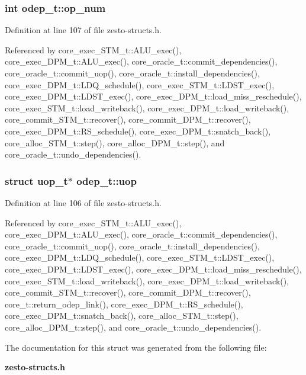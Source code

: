 \subsubsection[{op\_\-num}]{\setlength{\rightskip}{0pt plus 5cm}int {\bf odep\_\-t::op\_\-num}}\label{structodep__t_a9047cb0f60d68673900ec2fd18b2263}




Definition at line 107 of file zesto-structs.h.

Referenced by core\_\-exec\_\-STM\_\-t::ALU\_\-exec(), core\_\-exec\_\-DPM\_\-t::ALU\_\-exec(), core\_\-oracle\_\-t::commit\_\-dependencies(), core\_\-oracle\_\-t::commit\_\-uop(), core\_\-oracle\_\-t::install\_\-dependencies(), core\_\-exec\_\-DPM\_\-t::LDQ\_\-schedule(), core\_\-exec\_\-STM\_\-t::LDST\_\-exec(), core\_\-exec\_\-DPM\_\-t::LDST\_\-exec(), core\_\-exec\_\-DPM\_\-t::load\_\-miss\_\-reschedule(), core\_\-exec\_\-STM\_\-t::load\_\-writeback(), core\_\-exec\_\-DPM\_\-t::load\_\-writeback(), core\_\-commit\_\-STM\_\-t::recover(), core\_\-commit\_\-DPM\_\-t::recover(), core\_\-exec\_\-DPM\_\-t::RS\_\-schedule(), core\_\-exec\_\-DPM\_\-t::snatch\_\-back(), core\_\-alloc\_\-STM\_\-t::step(), core\_\-alloc\_\-DPM\_\-t::step(), and core\_\-oracle\_\-t::undo\_\-dependencies().
\subsubsection[{uop}]{\setlength{\rightskip}{0pt plus 5cm}struct {\bf uop\_\-t}$\ast$ {\bf odep\_\-t::uop}\hspace{0.3cm}{\tt  [read]}}\label{structodep__t_4870c3718dfdc8a6ac81f2455e8e7b60}




Definition at line 106 of file zesto-structs.h.

Referenced by core\_\-exec\_\-STM\_\-t::ALU\_\-exec(), core\_\-exec\_\-DPM\_\-t::ALU\_\-exec(), core\_\-oracle\_\-t::commit\_\-dependencies(), core\_\-oracle\_\-t::commit\_\-uop(), core\_\-oracle\_\-t::install\_\-dependencies(), core\_\-exec\_\-DPM\_\-t::LDQ\_\-schedule(), core\_\-exec\_\-STM\_\-t::LDST\_\-exec(), core\_\-exec\_\-DPM\_\-t::LDST\_\-exec(), core\_\-exec\_\-DPM\_\-t::load\_\-miss\_\-reschedule(), core\_\-exec\_\-STM\_\-t::load\_\-writeback(), core\_\-exec\_\-DPM\_\-t::load\_\-writeback(), core\_\-commit\_\-STM\_\-t::recover(), core\_\-commit\_\-DPM\_\-t::recover(), core\_\-t::return\_\-odep\_\-link(), core\_\-exec\_\-DPM\_\-t::RS\_\-schedule(), core\_\-exec\_\-DPM\_\-t::snatch\_\-back(), core\_\-alloc\_\-STM\_\-t::step(), core\_\-alloc\_\-DPM\_\-t::step(), and core\_\-oracle\_\-t::undo\_\-dependencies().

The documentation for this struct was generated from the following file:\begin{CompactItemize}
\item 
{\bf zesto-structs.h}\end{CompactItemize}
